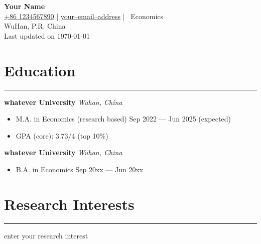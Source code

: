 \documentclass[a4paper,10pt]{article}
\begin{document}
	\vspace*{-2cm}
	
	\begin{center}
		\textbf{{\huge Your Name}}\\[0.2cm]
		\normalsize
		\faPhone\href{tel:+86 1234567890}{ +86 1234567890} \hspace{0.5cm}|\hspace{0.5cm} \faEnvelope\href{mailto: your--email--address}{ your--email--address} \hspace{0.5cm}|\hspace{0.5cm}
		\faMortarBoard\ Economics\\[0.2cm]
		WuHan, P.R. China\\[0.2cm]
		Last updated on \today
	\end{center}
	
	
	\section*{Education}
	\hrule
	\vspace{0.2cm}
	\textbf{whatever University} \hfill \textit{Wuhan, China}
	
	\begin{itemize}
		\item M.A. in Economics (research based) \hfill Sep 2022 --- Jun 2025 (expected)
		\item GPA (core): 3.73/4 (top 10\%)
	\end{itemize}
	\vspace{1em}
	\textbf{whatever University} \hfill \textit{Wuhan, China}
	\begin{itemize}
		\item B.A. in Economics \hfill Sep 20xx --- Jun 20xx
	\end{itemize}
	
	\section*{Research Interests}
	\hrule
	\vspace{0.2cm}
	enter your research interest
	
	
\end{document}

